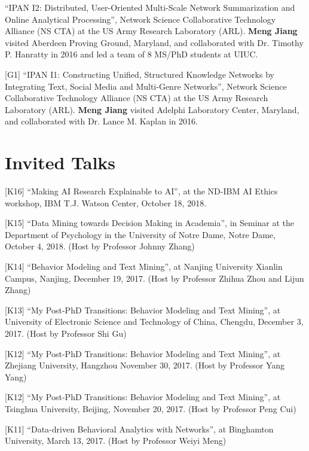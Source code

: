 \documentclass[margin, 9pt]{res}
\begin{document}
\begin{resume}
[G2] ``IPAN I2: Distributed, User-Oriented Multi-Scale Network Summarization and Online Analytical Processing'', Network Science Collaborative Technology Alliance (NS CTA) at the US Army Research Laboratory (ARL). \textbf{Meng Jiang} visited Aberdeen Proving Ground, Maryland, and collaborated with Dr. Timothy P. Hanratty in 2016 and led a team of 8 MS/PhD students at UIUC.

[G1] ``IPAN I1: Constructing Unified, Structured Knowledge Networks by Integrating Text, Social Media and Multi-Genre Networks'', Network Science Collaborative Technology Alliance (NS CTA) at the US Army Research Laboratory (ARL). \textbf{Meng Jiang} visited Adelphi Laboratory Center, Maryland, and collaborated with Dr. Lance M. Kaplan in 2016.


\section{Invited Talks}

[K16] ``Making AI Research Explainable to AI'', at the ND-IBM AI Ethics workshop, IBM T.J. Watson Center, October 18, 2018.

[K15] ``Data Mining towards Decision Making in Academia'', in Seminar at the Department of Psychology in the University of Notre Dame, Notre Dame, October 4, 2018. (Host by Professor Johnny Zhang)

[K14] ``Behavior Modeling and Text Mining'', at Nanjing University Xianlin Campus, Nanjing, December 19, 2017. (Host by Professor Zhihua Zhou and Lijun Zhang)

[K13] ``My Post-PhD Transitions: Behavior Modeling and Text Mining'', at University of Electronic Science and Technology of China, Chengdu, December 3, 2017. (Host by Professor Shi Gu)

[K12] ``My Post-PhD Transitions: Behavior Modeling and Text Mining'', at Zhejiang University, Hangzhou November 30, 2017. (Host by Professor Yang Yang)

[K12] ``My Post-PhD Transitions: Behavior Modeling and Text Mining'', at Tsinghua University, Beijing, November 20, 2017. (Host by Professor Peng Cui)

[K11] ``Data-driven Behavioral Analytics with Networks'', at Binghamton University, March 13, 2017. (Host by Professor Weiyi Meng)


\end{resume}
\end{document}
